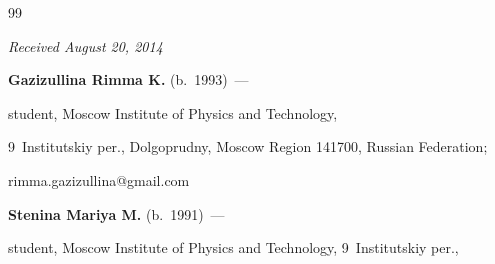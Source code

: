 {{\begin{thebibliography}{99}












\end{thebibliography}


} }








\vspace*{-6pt}





\hfill{\small\textit{Received August 20, 2014}}





\vspace*{-6pt}





\Contr





\vspace*{-3pt}





\noindent


\textbf{Gazizullina Rimma K.} (b.\ 1993)~---


student, Moscow Institute of Physics and Technology,


9~Institutskiy per., Dolgoprudny, Moscow Region 141700, Russian Federation;


rimma.gazizullina@gmail.com





\vspace*{1pt}





\noindent


\textbf{Stenina Mariya M.} (b.\ 1991)~---


student, Moscow Institute of Physics and Technology, 9~Institutskiy per.,


